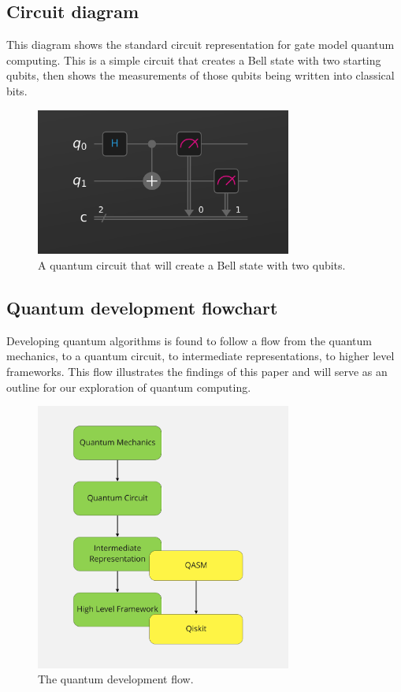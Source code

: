 \documentclass{article}
\begin{document}
\subsection{Circuit diagram}
This diagram shows the standard circuit representation for gate model quantum computing. This is a simple circuit that creates a Bell state with two starting qubits, then shows the measurements of those qubits being written into classical bits.
\begin{figure}[H]
    \centering
    \includegraphics[width=0.75\textwidth]{circuit.png}
    \caption{A quantum circuit that will create a Bell state with two qubits.}
\end{figure}

\subsection{Quantum development flowchart}
Developing quantum algorithms is found to follow a flow from the quantum mechanics, to a quantum circuit, to intermediate representations, to higher level frameworks. This flow illustrates the findings of this paper and will serve as an outline for our exploration of quantum computing. 
\begin{figure}[H]
    \centering
    \includegraphics[width=0.75\textwidth]{flowchart.png}
    \caption{The quantum development flow.}
\end{figure}
\end{document}
